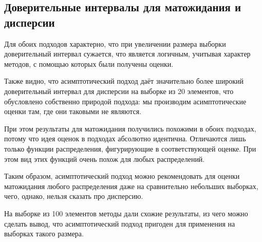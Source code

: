 \subsection{Доверительные интервалы для матожидания и дисперсии}

Для обоих подходов характерно, что при увеличении размера выборки доверительный интервал сужается, что является логичным, учитывая характер методов, с помощью которых были получены оценки.

Также видно, что асимптотический подход даёт значительно более широкий доверительный интервал для дисперсии на выборке из 20 элементов, что обусловлено собственно природой подхода: мы производим асимптотические оценки там, где они таковыми не являются.

При этом результаты для матожидания получились похожими в обоих подходах, потому что идея оценок в подходах абсолютно идентична. Отличаются лишь только функции распределения, фигурирующие в соответствующей оценке. При этом вид этих функций очень похож для любых распределений.

Таким образом, асимптотический подход можно рекомендовать для оценки матожидания любого распределения даже на сравнительно небольших выборках, чего, однако, нельзя сказать про дисперсию.

На выборке из 100 элементов методы дали схожие результаты, из чего можно сделать вывод, что асимптотический подход пригоден для применения на выборках такого размера.
